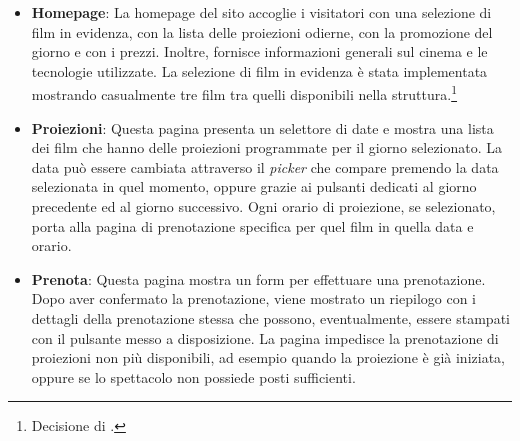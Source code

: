 \begin{itemize}
    \item \textbf{Homepage}:
    La homepage del sito accoglie i visitatori con una selezione di film in evidenza, con la lista delle proiezioni odierne, con la promozione del giorno e con i prezzi. Inoltre, fornisce informazioni generali sul cinema e le tecnologie utilizzate.
    La selezione di film in evidenza è stata implementata mostrando casualmente tre film tra quelli disponibili nella struttura.\footnote{Decisione di \textit{}.}
    \item \textbf{Proiezioni}:
    Questa pagina presenta un selettore di date e mostra una lista dei film che hanno delle proiezioni programmate per il giorno selezionato. La data può essere cambiata attraverso il \textit{picker} che compare premendo la data selezionata in quel momento, oppure grazie ai pulsanti dedicati al giorno precedente ed al giorno successivo. Ogni orario di proiezione, se selezionato, porta alla pagina di prenotazione specifica per quel film in quella data e orario.
    \item \textbf{Prenota}:
    Questa pagina mostra un form per effettuare una prenotazione. Dopo aver confermato la prenotazione, viene mostrato un riepilogo con i dettagli della prenotazione stessa che possono, eventualmente, essere stampati con il pulsante messo a disposizione. La pagina impedisce la prenotazione di proiezioni non più disponibili, ad esempio quando la proiezione è già iniziata, oppure se lo spettacolo non possiede posti sufficienti.
    

\end{itemize}
